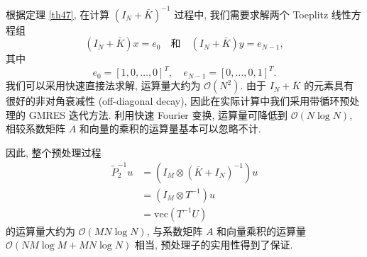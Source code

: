 \documentclass{ecnumaster}
\renewcommand{\O}{\mathcal{O}}
\begin{document}

根据定理 \ref{th47}, 在计算 $(I_N+\bar{K})^{-1}$ 过程中,
我们需要求解两个 Toeplitz 线性方程组
$$ (I_N+\bar{K}) x = e_0 \quad\text{和}\quad (I_N+\bar{K}) y = e_{N-1},$$
其中
$$
  e_0 = [1, 0, \dots, 0]^T, \quad e_{N-1} = [0, \dots, 0, 1]^T.
$$
我们可以采用快速直接法求解, 运算量大约为 $\O(N^2)$.
由于 $I_N+\bar{K}$ 的元素具有很好的非对角衰减性 (off-diagonal decay),
因此在实际计算中我们采用带循环预处理的 GMRES 迭代方法.
利用快速 Fourier 变换, 运算量可降低到 $\mathcal{O}(N\log N)$,
相较系数矩阵 $A$ 和向量的乘积的运算量基本可以忽略不计.

因此, 整个预处理过程
\begin{align*}
    \tilde{P}_2^{-1} u &= (I_M \otimes (\bar{K} + I_N)^{-1}) u\\
               &= (I_M \otimes T^{-1}) u\\
               &= \mathrm{vec}(T^{-1}U)
\end{align*}
的运算量大约为 $\mathcal{O}(MN \log N)$,
与系数矩阵 $A$ 和向量乘积的运算量 $\mathcal{O}(NM \log M + MN \log N)$ 相当,
预处理子的实用性得到了保证.
\end{document}

